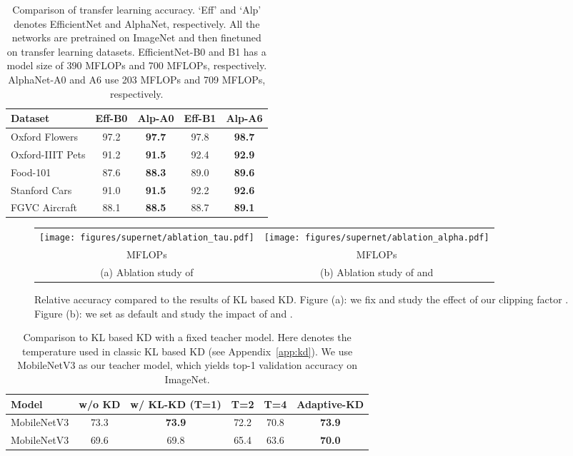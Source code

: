 \documentclass{article}
\begin{document}
\begin{table}[t]
    \centering
    \setlength{\tabcolsep}{2pt}
    \begin{tabular}{l|cc|cc}
    \hline 
    Dataset &  Eff-B0 & Alp-A0 & Eff-B1 & Alp-A6 \\ \hline 
    Oxford Flowers & 97.2 & \bf{97.7} & 97.8 & \bf 98.7 \\
    Oxford-IIIT Pets& 91.2 & \bf{91.5} & 92.4 & \bf 92.9\\
    Food-101 & 87.6  & \bf{88.3} & 89.0 & \bf 89.6\\
    Stanford Cars & 91.0& \bf{91.5} & 92.2 & \bf 92.6\\
    FGVC Aircraft & 88.1  & \bf{88.5} & 88.7 & \bf 89.1\\
    \hline 
    \end{tabular}
    \caption{
    Comparison of transfer learning accuracy.
    `Eff' and `Alp' denotes EfficientNet and AlphaNet, respectively.
    All the networks are pretrained on ImageNet and then finetuned on transfer learning datasets. 
    EfficientNet-B0 and B1 has a model size of 390 MFLOPs and 700 MFLOPs, respectively. AlphaNet-A0 and A6 use 203 MFLOPs  and 709 MFLOPs, respectively. 
    }
    \label{tab:transfer_learning}
\end{table}



\begin{figure*}[ht]
\centering
\begin{tabular}{cc}
\raisebox{2.5em}{\rotatebox{90}{\small Relative Accuracy}}
\texttt{[image: figures/supernet/ablation\_tau.pdf]} &
\raisebox{2.5em}{\rotatebox{90}{\small Relative Accuracy}}
\texttt{[image: figures/supernet/ablation\_alpha.pdf]} \\
\small MFLOPs  & \small MFLOPs \\
\small (a) Ablation study of  & \small (b) Ablation study of  and \\
\end{tabular}
\vspace{-0.5em}
\caption{Relative accuracy compared to the results of KL based KD. 
Figure (a): we fix  and study the effect of our clipping factor . 
Figure (b): we set  as default and study the impact of  and . 
}
\label{fig:abla_alpha}
\end{figure*}

\begin{table*}[ht]
    \centering
    \begin{tabular}{l|c|ccc|c}
    \hline 
      Model  & w/o KD &  w/ KL-KD (T=1) & T=2  &T=4  & Adaptive-KD \\ \hline
      MobileNetV3  & 73.3 &\bf 73.9 & 72.2 & 70.8 &\bf 73.9  \\ 
      MobileNetV3  & 69.6 & 69.8 & 65.4 & 63.6 & \bf 70.0 \\ \hline
    \end{tabular}
    \caption{
    Comparison to KL based KD with a fixed teacher model.
    Here  denotes the temperature used in classic KL based KD (see Appendix~\ref{app:kd}). 
    We use MobileNetV3  as our teacher model, which yields  top-1 validation accuracy on ImageNet. }
    \label{tab:mbv3}
\end{table*}
\end{document}

